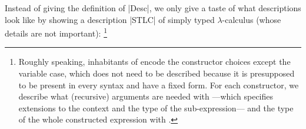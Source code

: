 \documentclass[sigplan,review,fleqn]{acmart}
\renewcommand{\verb}{\collectverb{\color{AgdaFunction}}}
\newcommand{\con}{\collectverb{\color{AgdaInductiveConstructor}}}
\begin{document}
Instead of giving the definition of \verb|Desc|, we only give a taste of what descriptions look like by showing a description \verb|STLC| of simply typed $\lambda$-calculus (whose details are not important):%
\footnote{Roughly speaking, inhabitants of  encode the constructor choices except the variable case, which does not need to be described because it is presupposed to be present in every syntax and have a fixed form.
For each constructor, we describe what (recursive) arguments are needed with  ---which specifies extensions to the context and the type of the sub-expression--- and the type of the whole constructed expression with .}
\end{document}
